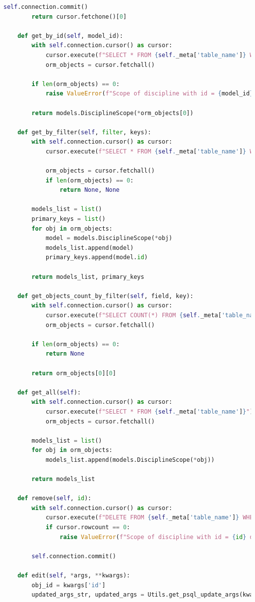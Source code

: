 \begin{lstlisting}[label=lst:db-postgresql, caption=Листинг модуля взаимодействия c СУБД PostgreSQL, language=python]
			self.connection.commit()
		return cursor.fetchone()[0]
	
	def get_by_id(self, model_id):
		with self.connection.cursor() as cursor:
			cursor.execute(f"SELECT * FROM {self._meta['table_name']} WHERE id = %s", (model_id,))
			orm_objects = cursor.fetchall()
		
		if len(orm_objects) == 0:
			raise ValueError(f"Scope of discipline with id = {model_id} doesn't exists")
		
		return models.DisciplineScope(*orm_objects[0])
		
	def get_by_filter(self, filter, keys):
		with self.connection.cursor() as cursor:
			cursor.execute(f"SELECT * FROM {self._meta['table_name']} WHERE {filter}", keys)
		
			orm_objects = cursor.fetchall()
			if len(orm_objects) == 0:
				return None, None
		
		models_list = list()
		primary_keys = list()
		for obj in orm_objects:
			model = models.DisciplineScope(*obj)
			models_list.append(model)
			primary_keys.append(model.id)
		
		return models_list, primary_keys
	
	def get_objects_count_by_filter(self, field, key):
		with self.connection.cursor() as cursor:
			cursor.execute(f"SELECT COUNT(*) FROM {self._meta['table_name']} WHERE {field} = %s", (key,))
			orm_objects = cursor.fetchall()
		
		if len(orm_objects) == 0:
			return None
		
		return orm_objects[0][0]
	
	def get_all(self):
		with self.connection.cursor() as cursor:
			cursor.execute(f"SELECT * FROM {self._meta['table_name']}")
			orm_objects = cursor.fetchall()
		
		models_list = list()
		for obj in orm_objects:
			models_list.append(models.DisciplineScope(*obj))
		
		return models_list
	
	def remove(self, id):
		with self.connection.cursor() as cursor:
			cursor.execute(f"DELETE FROM {self._meta['table_name']} WHERE id = %s", (id,))
			if cursor.rowcount == 0:
				raise ValueError(f"Scope of discipline with id = {id} doesn't exists.")
		
		self.connection.commit()
		
	def edit(self, *args, **kwargs):
		obj_id = kwargs['id']
		updated_args_str, updated_args = Utils.get_psql_update_args(kwargs['fields'])
		

\end{lstlisting}
